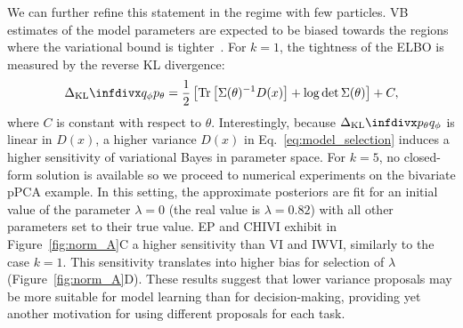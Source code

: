 We can further refine this statement in the regime with few particles. VB estimates of the model parameters are expected to be biased towards the regions where the variational bound is tighter~\cite{Turner2011}. For $k=1$, the tightness of the ELBO is measured by the reverse KL divergence:
\begin{align}
\label{eq:model_selection}
    \kl{q_\phi}{p_\theta} = \frac{1}{2}\left[\textrm{Tr}\left[\Sigma(\theta)^{-1}D(x)\right] + \log \det{\Sigma(\theta)}\right] + C,
\end{align}
where $C$ is constant with respect to $\theta$. Interestingly, because $\kl{p_\theta}{q_\phi}$ is linear in $D(x)$, a higher variance $D(x)$ in Eq.~\eqref{eq:model_selection} induces a higher sensitivity of variational Bayes in parameter space. For $k=5$, no closed-form solution is available so we proceed to numerical experiments on the bivariate pPCA example. In this setting, the approximate posteriors are fit for an initial value of the parameter $\lambda = 0$ (the real value is $\lambda=0.82$) with all other parameters set to their true value. EP and CHIVI exhibit in Figure~\ref{fig:norm_A}C a higher sensitivity than VI and IWVI, similarly to the case $k=1$. This sensitivity translates into higher bias for selection of $\lambda$ (Figure~\ref{fig:norm_A}D). These results suggest that lower variance proposals may be more suitable for model learning than for decision-making, providing yet another motivation for using different proposals for each task.
